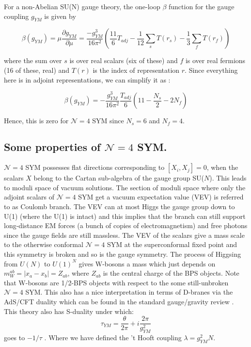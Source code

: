 For a non-Abelian SU(N) gauge theory, the one-loop $\beta$ 
function for the gauge coupling $g_{YM}$ is given by \cite{Gross:1973ju, 2012LMaPh..99...33M}
 
 
 \begin{equation}
 \beta(g_{YM}) = \mu \frac{\partial g_{YM}}{\partial \mu} = \frac{-g_{YM}^{3}}{16 \pi^{2}} \left ( \frac{11}{6}T_{adj} - \frac{1}{12} \sum_{s} T(r_{s}) - \frac{1}{3} \sum_{f} T(r_{f}) \right) 
 \end{equation}
 
where the sum over $s$ is over real scalars (six of these) and $f$ is over 
real fermions (16 of these, real) and $T(r)$ is the index of representation $r$. 
Since everything here is in adjoint representations, we can simplify it as : 
 
 \begin{equation}
   \beta(g_{YM}) = -\frac{g_{YM}^{3}}{16\pi^{2}}\frac{T_{adj}}{6}\left(11 - \frac{N_{s}}{2} - 2N_{f} \right) 
 \end{equation}
 
 Hence, this is zero for $\mathcal{N} = 4 $ SYM since $N_{s} = 6$ and $N_{f} = 4$. 
 
\subsection{Some properties of $\mathcal{N} = 4$ SYM.} 
 $\mathcal{N} = 4$ SYM possesses flat directions corresponding to $ [X_{i}, X_{j}] = 0$, when the scalars $X$ belong to the 
 Cartan sub-algebra of the gauge group SU($N$). This leads to moduli space of vacuum solutions. The section of moduli space where only the adjoint scalars of 
 $\mathcal{N} = 4$ SYM get a vacuum expectation value (VEV) is referred to as 
Coulomb branch. The VEV can at most Higgs the gauge group down to U(1) (where the U(1) is intact) 
and this implies that the branch can still support long-distance EM forces (a bunch of copies of electromagnetism) 
and free photons since the gauge fields are still massless. 
The VEV of the scalars give a mass scale to the otherwise conformal $\mathcal{N} = 4$ SYM at the superconformal fixed point
and this symmetry is broken and so is the gauge symmetry. The process of Higgsing from $U(N)$ to $U(1)^{N}$ gives W-bosons a mass which 
just depends on $ m_{W}^{ab}  = |x_a - x_b | = Z_{ab} $, where $Z_{ab}$ is the central charge of the BPS objects. 
Note that W-bosons are 1/2-BPS objects with respect to the some still-unbroken $\mathcal{N} = 4$ SYM. 
This also has a nice interpretation in terms of D-branes via the AdS/CFT duality which can be found in the standard 
gauge/gravity review \cite{Aharony:1999ti}. This theory also has S-duality under which:
\[ \tau_{YM} = \frac{\theta}{2\pi} + i \frac{2\pi}{g^{2}_{YM}} \]
goes to $ -1/\tau$ . Where we have defined the 't Hooft coupling $ \lambda = g_{YM}^{2} N $. 


